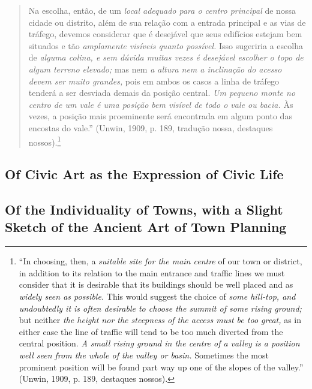 \documentclass[12pt, a4paper]{book} %
\begin{document}
        \begin{quotation}
            Na escolha, então, de um \textit{local adequado para o centro principal} de nossa cidade ou distrito, além de sua relação com a entrada principal e as vias de tráfego, devemos considerar que é desejável que seus edifícios estejam bem situados e tão \textit{amplamente visíveis quanto possível.} Isso sugeriria a escolha de \textit{alguma colina, e sem dúvida muitas vezes é desejável escolher o topo de algum terreno elevado;} mas nem \textit{a altura nem a inclinação do acesso devem ser muito grandes,} pois em ambos os casos a linha de tráfego tenderá a ser desviada demais da posição central. \textit{Um pequeno monte no centro de um vale é uma posição bem visível de todo o vale ou bacia.} Às vezes, a posição mais proeminente será encontrada em algum ponto das encostas do vale.'' (Unwin, 1909, p. 189, tradução nossa, destaques nossos).\footnote[64]{``In choosing, then, a \textit{suitable site for the main centre} of our town or district, in addition to its relation to the main entrance and traffic lines we must consider that it is desirable that its buildings should be well placed and as \textit{widely seen as possible.} This would suggest the choice of \textit{some hill-top, and undoubtedly it is often desirable to choose the summit of some rising ground;} but neither \textit{the height nor the steepness of the access must be too great,} as in either case the line of traffic will tend to be too much diverted from the central position. \textit{A small rising ground in the centre of a valley is a position well seen from the whole of the valley or basin.} Sometimes the most prominent position will be found part way up one of the slopes of the valley.'' (Unwin, 1909, p. 189, destaques nossos).}
        \end{quotation}













        \subsection*{Of Civic Art as the Expression of Civic Life}
        \subsection*{Of the Individuality of Towns, with a Slight Sketch of the Ancient Art of Town Planning}
\end{document}

